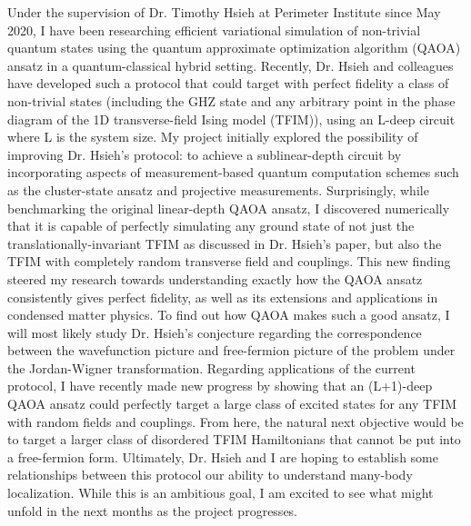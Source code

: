 \documentclass[12pt]{article}
\begin{document}
Under the supervision of Dr. Timothy Hsieh at Perimeter Institute since May 2020, I have been researching efficient variational simulation of non-trivial quantum states using the quantum approximate optimization algorithm (QAOA) ansatz in a quantum-classical hybrid setting. Recently, Dr. Hsieh and colleagues have developed such a protocol that could target with perfect fidelity a class of non-trivial states (including the GHZ state and any arbitrary point in the phase diagram of the 1D transverse-field Ising model (TFIM)), using an L-deep circuit where L is the system size. My project initially explored the possibility of improving Dr. Hsieh's protocol: to achieve a sublinear-depth circuit by incorporating aspects of measurement-based quantum computation schemes such as the cluster-state ansatz and projective measurements. Surprisingly, while benchmarking the original linear-depth QAOA ansatz, I discovered numerically that it is capable of perfectly simulating any ground state of not just the translationally-invariant TFIM as discussed in Dr. Hsieh's paper, but also the TFIM with completely random transverse field and couplings. This new finding steered my research towards understanding exactly how the QAOA ansatz consistently gives perfect fidelity, as well as its extensions and applications in condensed matter physics. To find out how QAOA makes such a good ansatz, I will most likely study Dr. Hsieh's conjecture regarding the correspondence between the wavefunction picture and free-fermion picture of the problem under the Jordan-Wigner transformation. Regarding applications of the current protocol, I have recently made new progress by showing that an (L+1)-deep QAOA ansatz could perfectly target a large class of excited states for any TFIM with random fields and couplings. From here, the natural next objective would be to target a larger class of disordered TFIM Hamiltonians that cannot be put into a free-fermion form. Ultimately, Dr. Hsieh and I are hoping to establish some relationships between this protocol our ability to understand many-body localization. While this is an ambitious goal, I am excited to see what might unfold in the next months as the project progresses. \\ \vspace{-9pt}
\end{document}
